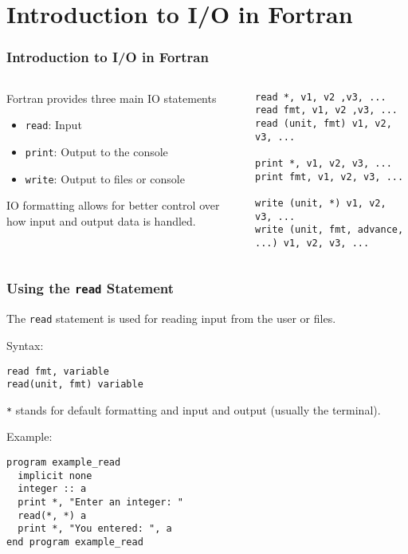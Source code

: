 
\subtitle{Lecture 7: Input/Output in Fortran: Read, Print, Write, and Formatting}



\begin{frame}
  \titlepage
\end{frame}

\section{Introduction to I/O in Fortran}

\begin{frame}[fragile]
  \frametitle{Introduction to I/O in Fortran}
  \begin{columns}[T]
  \begin{column}{0.5\textwidth}
    Fortran provides three main IO statements
      \begin{itemize}
        \item \texttt{read}: Input
        \item \texttt{print}: Output to the console
        \item \texttt{write}: Output to files or console
      \end{itemize}

    \vspace*{2mm}
    IO formatting allows for better control over how input and output data is handled.

        \end{column}
    \begin{column}{0.5\textwidth}
\begin{lstlisting}
read *, v1, v2 ,v3, ...
read fmt, v1, v2 ,v3, ...
read (unit, fmt) v1, v2, v3, ...

print *, v1, v2, v3, ...
print fmt, v1, v2, v3, ...

write (unit, *) v1, v2, v3, ...
write (unit, fmt, advance, ...) v1, v2, v3, ...
\end{lstlisting}
    \end{column}
    \end{columns}
\end{frame}


\begin{frame}[fragile]
  \frametitle{Using the \texttt{read} Statement}
  The \texttt{read} statement is used for reading input from the user or files.

  \vspace*{2mm}
  Syntax:
      \begin{lstlisting}
read fmt, variable
read(unit, fmt) variable
      \end{lstlisting}
    \texttt{*} stands for default formatting and input and output (usually the terminal).

      \vspace*{2mm}
  Example:
  \begin{lstlisting}
program example_read
  implicit none
  integer :: a
  print *, "Enter an integer: "
  read(*, *) a
  print *, "You entered: ", a
end program example_read
  \end{lstlisting}
\end{frame}


